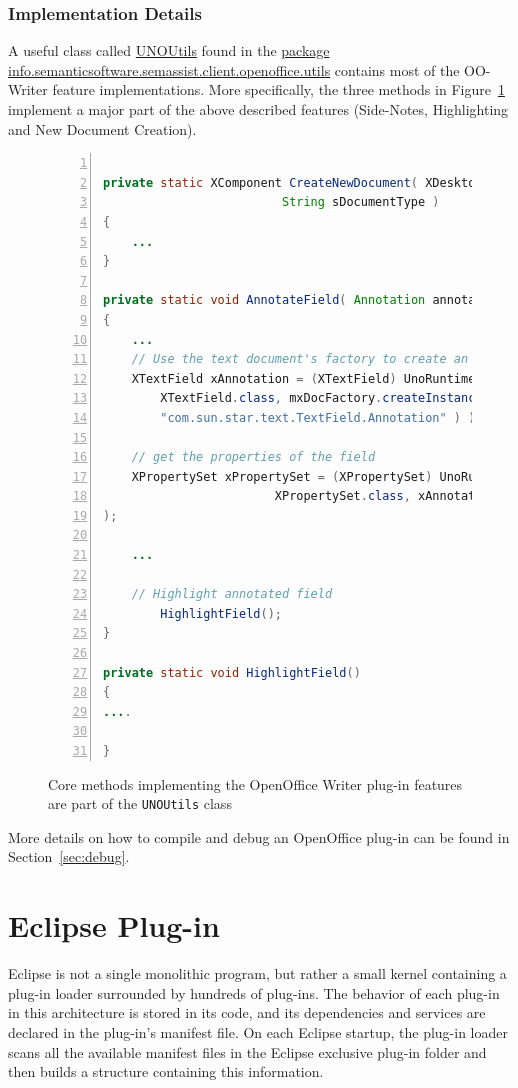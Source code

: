 \subsubsection{Implementation Details}
A useful class called \url{UNOUtils} found in the \url{package
  info.semanticsoftware.semassist.client.openoffice.utils} contains most of
the OO-Writer feature implementations.  More specifically, the three methods in
Figure~\ref{list:ssb} implement a major part of the above described features
(Side-Notes, Highlighting and New Document Creation).

\begin{figure}
\centering
\begin{lstlisting}[language=Java,numbers=left,xleftmargin=8mm,columns=flexible]

private static XComponent CreateNewDocument( XDesktop xDesktop, 
					     String sDocumentType )
{
	...
}

private static void AnnotateField( Annotation annotation )
{
	...
	// Use the text document's factory to create an Annotation text field
	XTextField xAnnotation = (XTextField) UnoRuntime.queryInterface(
		XTextField.class, mxDocFactory.createInstance(
		"com.sun.star.text.TextField.Annotation" ) );
	
	// get the properties of the field
	XPropertySet xPropertySet = (XPropertySet) UnoRuntime.queryInterface( 
						XPropertySet.class, xAnnotation
);
	
	...
	
	// Highlight annotated field
        HighlightField();
}

private static void HighlightField()
{
....

}
\end{lstlisting}
\caption{Core methods implementing the OpenOffice Writer plug-in features are
  part of the \texttt{UNOUtils} class}
\label{list:ssb}
\end{figure}


More details on how to compile and debug an OpenOffice plug-in can be found in
Section~\ref{sec:debug}.
 
\section{Eclipse Plug-in}
Eclipse is not a single monolithic program, but rather a small kernel containing
a plug-in loader surrounded by hundreds of plug-ins. The behavior of each
plug-in in this architecture is stored in its code, and its dependencies and
services are declared in the plug-in's manifest file. On each Eclipse startup,
the plug-in loader scans all the available manifest files in the Eclipse
exclusive plug-in folder and then builds a structure containing this
information.

